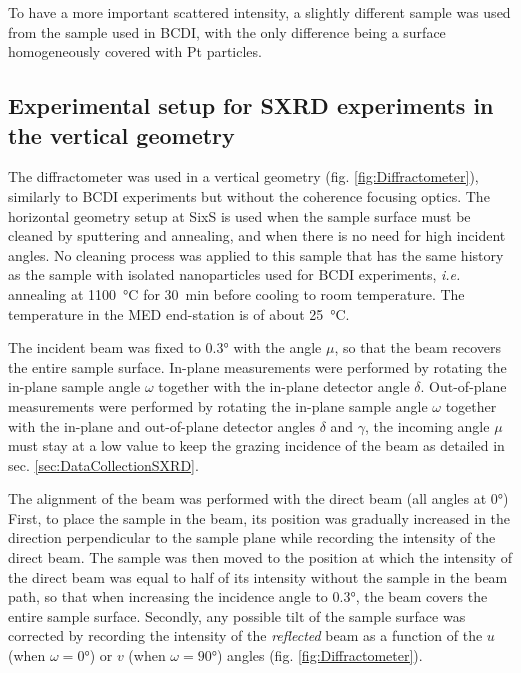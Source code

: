 To have a more important scattered intensity, a slightly different sample was used from the sample used in BCDI, with the only difference being a surface homogeneously covered with Pt particles.

\subsection{Experimental setup for SXRD experiments in the vertical geometry}\label{sec:SXRDSetupV}

The diffractometer was used in a vertical geometry (fig. \ref{fig:Diffractometer}), similarly to BCDI experiments but without the coherence focusing optics.
The horizontal geometry setup at SixS is used when the sample surface must be cleaned by sputtering and annealing, and when there is no need for high incident angles.
No cleaning process was applied to this sample that has the same history as the sample with isolated nanoparticles used for BCDI experiments, \textit{i.e.} annealing at \qty{1100}{\degreeCelsius} for \qty{30}{\minute} before cooling to room temperature.
The temperature in the MED end-station is of about \qty{25}{\degreeCelsius}.

The incident beam was fixed to \ang{0.3} with the angle $\mu$, so that the beam recovers the entire sample surface.
In-plane measurements were performed by rotating the in-plane sample angle $\omega$ together with the in-plane detector angle $\delta$.
Out-of-plane measurements were performed by rotating the in-plane sample angle $\omega$ together with the in-plane and out-of-plane detector angles $\delta$ and $\gamma$, the incoming angle $\mu$ must stay at a low value to keep the grazing incidence of the beam as detailed in sec. \ref{sec:DataCollectionSXRD}.

The alignment of the beam was performed with the direct beam (all angles at \ang{0})
First, to place the sample in the beam, its position was gradually increased in the direction perpendicular to the sample plane while recording the intensity of the direct beam.
The sample was then moved to the position at which the intensity of the direct beam was equal to half of its intensity without the sample in the beam path, so that when increasing the incidence angle to \ang{0.3}, the beam covers the entire sample surface.
Secondly, any possible tilt of the sample surface was corrected by recording the intensity of the \textit{reflected} beam as a function of the $u$ (when $\omega=\ang{0}$) or $v$ (when $\omega=\ang{90}$) angles (fig. \ref{fig:Diffractometer}).

